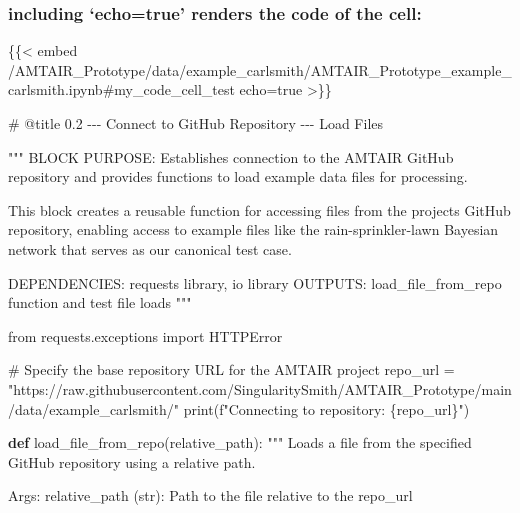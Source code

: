 \documentclass[
  11pt,
  letterpaper,
]{book}
\newenvironment{Shaded}{\begin{snugshade}}{\end{snugshade}}
\newcommand{\BuiltInTok}[1]{\textcolor[rgb]{0.00,0.23,0.31}{#1}}
\newcommand{\CommentTok}[1]{\textcolor[rgb]{0.37,0.37,0.37}{#1}}
\newcommand{\ImportTok}[1]{\textcolor[rgb]{0.00,0.46,0.62}{#1}}
\newcommand{\KeywordTok}[1]{\textcolor[rgb]{0.00,0.23,0.31}{\textbf{#1}}}
\newcommand{\NormalTok}[1]{\textcolor[rgb]{0.00,0.23,0.31}{#1}}
\newcommand{\OperatorTok}[1]{\textcolor[rgb]{0.37,0.37,0.37}{#1}}
\newcommand{\SpecialCharTok}[1]{\textcolor[rgb]{0.37,0.37,0.37}{#1}}
\newcommand{\SpecialStringTok}[1]{\textcolor[rgb]{0.13,0.47,0.30}{#1}}
\newcommand{\StringTok}[1]{\textcolor[rgb]{0.13,0.47,0.30}{#1}}
\begin{document}
\subsubsection{including `echo=true' renders the code of the
cell:}\label{including-echotrue-renders-the-code-of-the-cell}

\begin{Shaded}
\begin{Highlighting}[]
\NormalTok{\{\{\textless{} embed /AMTAIR\_Prototype/data/example\_carlsmith/AMTAIR\_Prototype\_example\_carlsmith.ipynb\#my\_code\_cell\_test echo=true \textgreater{}\}\}}
\end{Highlighting}
\end{Shaded}

\label{my_code_cell_test}
\begin{Shaded}
\begin{Highlighting}[]
\CommentTok{\# @title 0.2 {-}{-}{-} Connect to GitHub Repository {-}{-}{-} Load Files}

\CommentTok{"""}
\CommentTok{BLOCK PURPOSE: Establishes connection to the AMTAIR GitHub repository and provides}
\CommentTok{functions to load example data files for processing.}

\CommentTok{This block creates a reusable function for accessing files from the project\textquotesingle{}s}
\CommentTok{GitHub repository, enabling access to example files like the rain{-}sprinkler{-}lawn}
\CommentTok{Bayesian network that serves as our canonical test case.}

\CommentTok{DEPENDENCIES: requests library, io library}
\CommentTok{OUTPUTS: load\_file\_from\_repo function and test file loads}
\CommentTok{"""}

\ImportTok{from}\NormalTok{ requests.exceptions }\ImportTok{import}\NormalTok{ HTTPError}

\CommentTok{\# Specify the base repository URL for the AMTAIR project}
\NormalTok{repo\_url }\OperatorTok{=} \StringTok{"https://raw.githubusercontent.com/SingularitySmith/AMTAIR\_Prototype/main/data/example\_carlsmith/"}
\BuiltInTok{print}\NormalTok{(}\SpecialStringTok{f"Connecting to repository: }\SpecialCharTok{\{}\NormalTok{repo\_url}\SpecialCharTok{\}}\SpecialStringTok{"}\NormalTok{)}

\KeywordTok{def}\NormalTok{ load\_file\_from\_repo(relative\_path):}
    \CommentTok{"""}
\CommentTok{    Loads a file from the specified GitHub repository using a relative path.}

\CommentTok{    Args:}
\CommentTok{        relative\_path (str): Path to the file relative to the repo\_url}


\end{Highlighting}
\end{Shaded}
\end{document}

